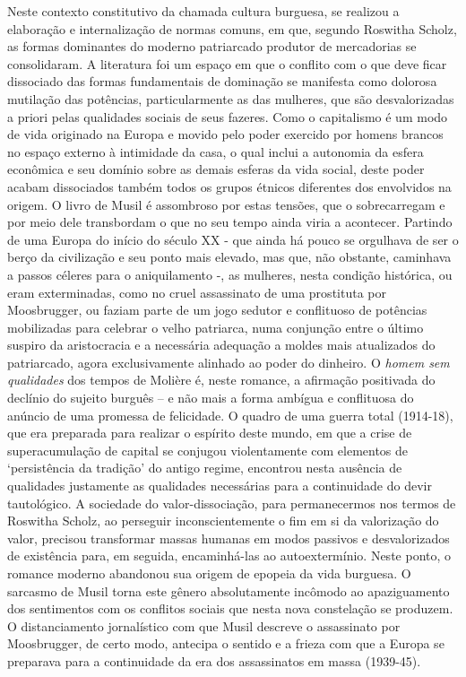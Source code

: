 Neste contexto constitutivo da chamada cultura burguesa, se realizou a
elaboração e internalização de normas comuns, em que, segundo Roswitha
Scholz, as formas dominantes do moderno patriarcado produtor de
mercadorias se consolidaram. A literatura foi um espaço em que o
conflito com o que deve ficar dissociado das formas fundamentais de
dominação se manifesta como dolorosa mutilação das potências,
particularmente as das mulheres, que são desvalorizadas a priori pelas
qualidades sociais de seus fazeres. Como o capitalismo é um modo de vida
originado na Europa e movido pelo poder exercido por homens brancos no
espaço externo à intimidade da casa, o qual inclui a autonomia da esfera
econômica e seu domínio sobre as demais esferas da vida social, deste
poder acabam dissociados também todos os grupos étnicos diferentes dos
envolvidos na origem. O livro de Musil é assombroso por estas tensões,
que o sobrecarregam e por meio dele transbordam o que no seu tempo ainda
viria a acontecer. Partindo de uma Europa do início do século XX - que
ainda há pouco se orgulhava de ser o berço da civilização e seu ponto
mais elevado, mas que, não obstante, caminhava a passos céleres para o
aniquilamento -, as mulheres, nesta condição histórica, ou eram
exterminadas, como no cruel assassinato de uma prostituta por
Moosbrugger, ou faziam parte de um jogo sedutor e conflituoso de
potências mobilizadas para celebrar o velho patriarca, numa conjunção
entre o último suspiro da aristocracia e a necessária adequação a moldes
mais atualizados do patriarcado, agora exclusivamente alinhado ao poder
do dinheiro. O \emph{homem sem qualidades} dos tempos de Molière é,
neste romance, a afirmação positivada do declínio do sujeito burguês --
e não mais a forma ambígua e conflituosa do anúncio de uma promessa de
felicidade. O quadro de uma guerra total (1914-18), que era preparada
para realizar o espírito deste mundo, em que a crise de superacumulação
de capital se conjugou violentamente com elementos de `persistência da
tradição' do antigo regime, encontrou nesta ausência de qualidades
justamente as qualidades necessárias para a continuidade do devir
tautológico. A sociedade do valor-dissociação, para permanecermos nos
termos de Roswitha Scholz, ao perseguir inconscientemente o fim em si da
valorização do valor, precisou transformar massas humanas em modos
passivos e desvalorizados de existência para, em seguida, encaminhá-las
ao autoextermínio. Neste ponto, o romance moderno abandonou sua origem
de epopeia da vida burguesa. O sarcasmo de Musil torna este gênero
absolutamente incômodo ao apaziguamento dos sentimentos com os conflitos
sociais que nesta nova constelação se produzem. O distanciamento
jornalístico com que Musil descreve o assassinato por Moosbrugger, de
certo modo, antecipa o sentido e a frieza com que a Europa se preparava
para a continuidade da era dos assassinatos em massa (1939-45).

